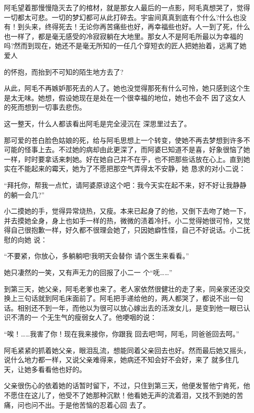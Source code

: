 \documentclass{article}
\begin{document}
阿毛望着那慢慢隐灭去了的棺材，就是那女人最后的一点影，阿毛真想哭了，觉得一切都太可悲。一切的梦幻都可从此打碎去。宇宙间真真到底有个什么?什么也没有！到头来，终得死去！无论你再苦痛些也好，再幸福些也好。人一到了死，什么也一样了，都是毫无感受的冷寂寂躺在大地里。那女人不是阿毛所最以为幸福的吗?然而到现在，她还不是毫无所知的一任几个穿短衣的匠人把她抬着，远离了她爱人
\newpage

的怀抱，而抬到不可知的陌生地方去了? 

从此，阿毛不再嫉妒那死去的人了。她也没觉得那死有什么可怜，她只感到这个生是太无味。她想，假设她现在是处在一个很幸福的地位，她也不会不
因了这女人的死而想到一切事去悲伤。 

这一整天，什么人都该看出阿毛是完全浸沉在
深思里过去了。 


那可爱的苍白脸色姑娘的死，给与阿毛思想上一个转变，使她不再去梦想到许多不可能的怪事上去。不过她的病却由此更深了，而阿婆巳知道不是喜，好象很恼了她一样，时时要拿话来刺她。好在她自己并不在乎，也不把那些话放在心上。直到她实在不能起来的霉天，她为了不愿把那空气弄得太不安静，她
恳求的对小二说： 

“拜托你，帮我一点忙，请阿婆原谅这个吧：我今天实在起不来，好不好让我静静的躺一会几?”
\newpage


小二摸她的手，觉得异常烧热，又瘦。本来已起身了的他，又倒下去吻了她一下，并去摸她全身，身上也如手一样的热，微微的渍着冷扦。小二觉得她很可怜，又觉得自己很抱歉一样，好久都不很理会她了，只因她癖性怪，自己不好说话。小二抚慰的向她
说： 

“不要紧，你放心，多躺躺吧!我明天会替你
请个医生来看看。” 

她只凄然的一笑，又有声无力的回报了小二一
个“呒……” 

到第三天，她父亲，阿毛老爹也来了。老人家依然很健壮的走了来，同亲家还没交换上三句话就到阿毛床面前了。阿毛把手递给他的，两人都哭了，都说不出一句话。相别还不到一年，而他以为很可以放心嫁出去的活泼女儿，是变到他一眼已认识不清的一
个无生气的瘦弱女人了。他哽咽的说： 

\newpage

“唉！……我害了你！现在我来接你，你跟我
回去吧!呵，阿毛，同爸爸回去呵。” 

阿毛紧紧的抓着她父亲，眼泪乱流，想能同着父亲回去也好。然而最后她又摇头，说什么地力都一样，又说父亲难得来，她病还不知会好不会好，来了
就多住几天，让她多看看他也好的。 

父亲很伤心的依着她的话暂时留下，不过，只住到第三天，他便发誓他宁肯死，他不愿住在这儿了，他受不了她那种沉默！他看她无声的流着泪，又找不到她的苦痛，问也问不出。于是他苦恼的忍着心回
去了。 
\end{document}
